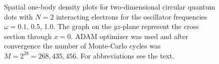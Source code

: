 \begin{landscape}
\begin{figure} [H]
		\caption{Spatial one-body density plots for two-dimensional circular quantum dots with $N=2$ interacting electrons for the oscillator frequencies $\omega=0.1$, 0.5, 1.0. The graph on the $yz$-plane represent the cross section through $x=0$. ADAM optimizer was used and after convergence the number of Monte-Carlo cycles was $M=2^{28}=268,435,456$. For abbreviations see the text.}
		\label{fig:OB2_interaction_2P}
	\end{figure}
	\begin{figure} [H]%
		\centering
		\captionsetup[subfigure]{labelformat=empty}
		\captionsetup{width=0.9\hsize}
		\hspace{0.cm}
		\hspace{-0.0cm}
		\hspace{-0.0cm}
		\hspace{-0.0cm}
		\\ [-0.3cm]
		

\end{figure}
\end{landscape}
